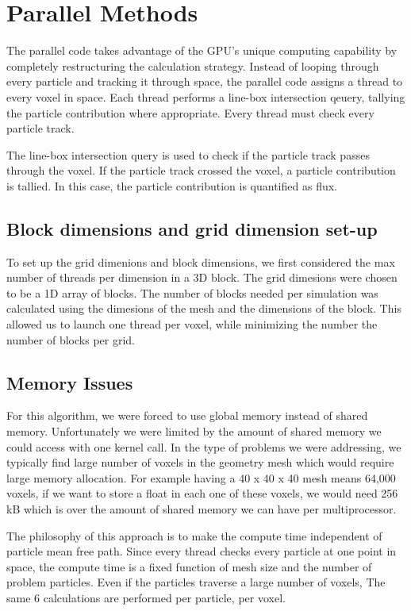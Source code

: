 \section{Parallel Methods}
The parallel code takes advantage of the GPU's unique computing capability by
completely restructuring the calculation strategy. Instead of looping through
every particle and tracking it through space, the parallel code assigns a thread
to every voxel in space. Each thread performs a line-box intersection qeuery,
tallying the particle contribution where appropriate\cite{ray_trace}. Every thread must check
every particle track. 

The line-box intersection query is used to check if the particle track passes 
through the voxel. If the particle track crossed the voxel, a particle contribution 
is tallied. In this case, the particle contribution is quantified as flux. 

\subsection{Block dimensions and grid dimension set-up}
To set up the grid dimenions and block dimensions, we first considered the max number of 
threads per dimension in a 3D block. 
The grid dimesions were chosen to be a 1D array of blocks. The number of blocks 
needed per simulation was calculated using the dimesions of the mesh and the 
dimensions of the block. This allowed us to launch one thread per voxel, while 
minimizing the number the number of blocks per grid. 

\subsection{Memory Issues}
For this algorithm, we were forced to use global memory instead of shared memory. 
Unfortunately we were limited by the amount of shared memory we 
could access with one kernel call. In the type of problems we were addressing, 
we typically find large number of voxels in the geometry mesh which would require 
large memory allocation. For example having a 40 x 40 x 40 mesh means 64,000 
voxels, if we want to store a float in each one of these voxels, we would need 
256 kB which is over the amount of shared memory we can have per multiprocessor.   


The philosophy of this approach is to make the compute time independent of
particle mean free path. Since every thread checks every particle at one point
in space, the compute time is a fixed function of mesh size and the number of
problem particles. Even if the particles traverse a large number of voxels, The
same 6 calculations are performed per particle, per voxel.

